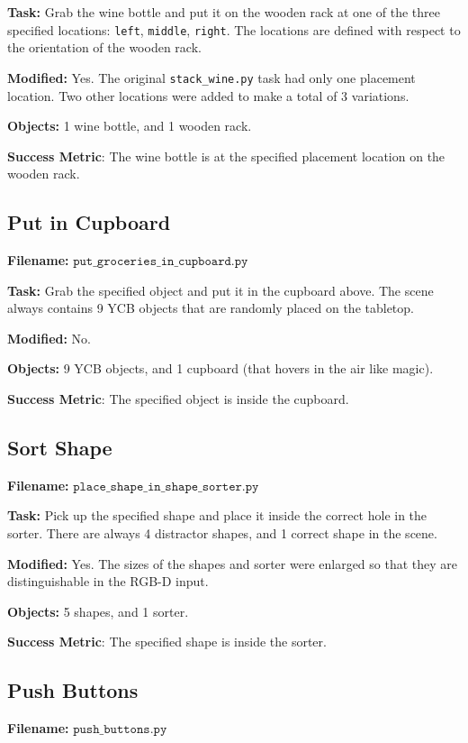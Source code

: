 \documentclass{article}
\begin{document}
\textbf{Task:} Grab the wine bottle and put it on the wooden rack at one of the three specified locations: \texttt{left}, \texttt{middle}, \texttt{right}. The locations are defined with respect to the orientation of the wooden rack. 

\textbf{Modified:} Yes. The original \texttt{stack\_wine.py} task had only one placement location. Two other locations were added to make a total of 3 variations. 

\textbf{Objects:} 1 wine bottle, and 1 wooden rack.

\textbf{Success Metric}: The wine bottle is at the specified placement location on the wooden rack. 

\subsection{Put in Cupboard}
\textbf{Filename:} $\texttt{put\_groceries\_in\_cupboard.py}$ 

\textbf{Task:} Grab the specified object and put it in the cupboard above. The scene always contains 9 YCB objects that are randomly placed on the tabletop.  

\textbf{Modified:} No.

\textbf{Objects:} 9 YCB objects, and 1 cupboard (that hovers in the air like magic). 

\textbf{Success Metric}: The specified object is inside the cupboard.

\subsection{Sort Shape}
\textbf{Filename:} $\texttt{place\_shape\_in\_shape\_sorter.py}$ 

\textbf{Task:} Pick up the specified shape and place it inside the correct hole in the sorter. There are always 4 distractor shapes, and 1 correct shape in the scene.

\textbf{Modified:} Yes. The sizes of the shapes and sorter were enlarged so that they are distinguishable in the RGB-D input. 

\textbf{Objects:} 5 shapes, and 1 sorter.

\textbf{Success Metric}: The specified shape is inside the sorter.

\subsection{Push Buttons}
\textbf{Filename:} $\texttt{push\_buttons.py}$ 
\end{document}
